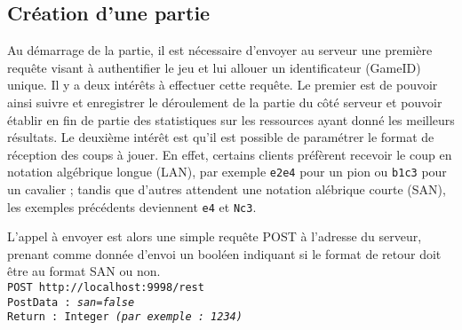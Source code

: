 \documentclass[a4paper,11pt]{article}
\begin{document}
\subsection{Création d’une partie}
        Au démarrage de la partie, il est nécessaire d’envoyer au serveur une première requête visant à authentifier le jeu et lui allouer un identificateur (GameID) unique. Il y a deux intérêts à effectuer cette requête. Le premier est de pouvoir ainsi suivre et enregistrer le déroulement de la partie du côté serveur et pouvoir établir en fin de partie des statistiques sur les ressources ayant donné les meilleurs résultats. Le deuxième intérêt est qu’il est possible de paramétrer le format de réception des coups à jouer. En effet, certains clients préfèrent recevoir le coup en notation algébrique longue (LAN), par exemple {\tt e2e4} pour un pion ou {\tt b1c3} pour un cavalier ; tandis que d’autres attendent une notation alébrique courte (SAN), les exemples précédents deviennent {\tt e4} et {\tt Nc3}.


        L’appel à envoyer est alors une simple requête POST à l’adresse du serveur, prenant comme donnée d’envoi un booléen indiquant si le format de retour doit être au format SAN ou non.
\\{\tt POST http://localhost:9998/rest\\
PostData : {\em san=false}\\
Return : Integer {\em (par exemple : 1234)} }\\
\end{document}
